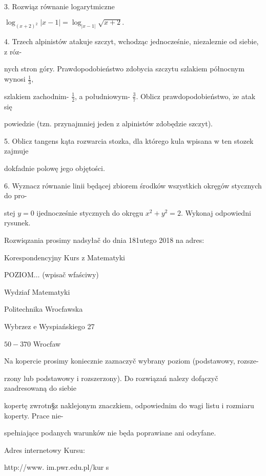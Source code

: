 \documentclass[a4paper,12pt]{article}
\begin{document}
3. Rozwiąz równanie logarytmiczne

$\log_{(x+2)^{2}}|x-1|=\log_{|x-1|}\sqrt{x+2}.$

4. Trzech alpinistów atakuje szczyt, wchodząc jednocześnie, niezaleznie od siebie, $\mathrm{z}$ róz-

nych stron góry. Prawdopodobieństwo zdobycia szczytu szlakiem północnym wynosi $\displaystyle \frac{1}{3},$

szlakiem zachodnim- $\displaystyle \frac{1}{2}$, a południowym- $\displaystyle \frac{3}{7}$. Oblicz prawdopodobieństwo, $\dot{\mathrm{z}}\mathrm{e}$ atak się

powiedzie (tzn. przynajmniej jeden $\mathrm{z}$ alpinistów zdobędzie szczyt).

5. Oblicz tangens kąta rozwarcia stozka, dla którego kula wpisana w ten stozek zajmuje

dokfadnie polowę jego objętości.

6. Wyznacz równanie linii będącej zbiorem środków wszystkich okręgów stycznych do pro-

stej $y=0$ ijednocześnie stycznych do okręgu $x^{2}+y^{2}=2$. Wykonaj odpowiedni rysunek.

Rozwiqzania prosimy nadsyłač do dnia 181utego 2018 na adres:

Korespondencyjny Kurs $\mathrm{z}$ Matematyki

POZIOM$\ldots$ (wpisač wfaściwy)

Wydziaf Matematyki

Politechnika Wrocfawska

Wybrzez $\mathrm{e}$ Wyspiańskiego 27

$50-370$ Wrocfaw

Na kopercie prosimy koniecznie zaznaczyč wybrany poziom (podstawowy, rozsze-

rzony lub podstawowy $\mathrm{i}$ rozszerzony). Do rozwiązań nalez$\mathrm{y}$ dofączyč zaadresowaną do siebie

kopertę zwrotn\S z naklejonym znaczkiem, odpowiednim do wagi listu $\mathrm{i}$ rozmiaru koperty. Prace nie-

spełniające podanych warunków nie będa poprawiane ani odsyfane.

Adres internetowy Kursu:

http://www. im.pwr.edu.pl/kur s
\end{document}
